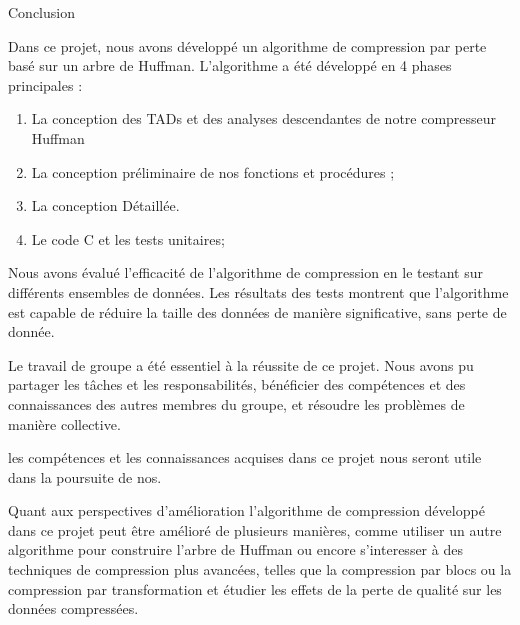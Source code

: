 Conclusion

Dans ce projet, nous avons développé un algorithme de compression par perte basé sur un arbre de Huffman. L'algorithme a été développé en 4 phases principales :

   \begin{enumerate}
\item La conception des TADs et des analyses descendantes de notre compresseur Huffman
\item La conception préliminaire de nos fonctions et procédures ;
\item La conception Détaillée.
\item Le code C et les tests unitaires;
\end{enumerate}

Nous avons évalué l'efficacité de l'algorithme de compression en le testant sur différents ensembles de données. Les résultats des tests montrent que l'algorithme est capable de réduire la taille des données de manière significative, sans perte de donnée.

Le travail de groupe a été essentiel à la réussite de ce projet. Nous avons pu partager les tâches et les responsabilités, bénéficier des compétences et des connaissances des autres membres du groupe, et résoudre les problèmes de manière collective.

les compétences et les connaissances acquises dans ce projet nous seront utile dans la poursuite de nos.

Quant aux perspectives d'amélioration l'algorithme de compression développé dans ce projet peut être amélioré de plusieurs manières, comme utiliser un autre algorithme pour construire l'arbre de Huffman ou encore s'interesser à des techniques de compression plus avancées, telles que la compression par blocs ou la compression par transformation et étudier les effets de la perte de qualité sur les données compressées.
